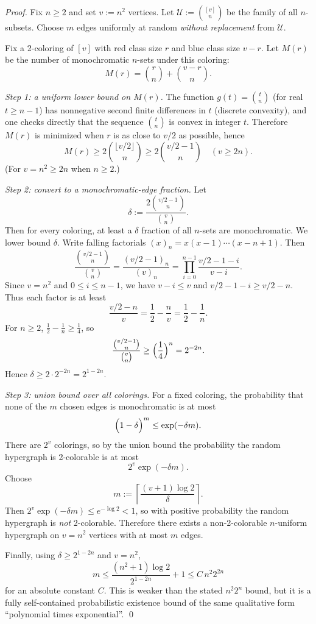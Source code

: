 \emph{Proof.}
Fix $n\ge 2$ and set $v:=n^2$ vertices. Let $\mathcal{U}:=\binom{[v]}{n}$ be the
family of all $n$-subsets.
Choose $m$ edges uniformly at random \emph{without replacement} from $\mathcal{U}$.

Fix a 2-coloring of $[v]$ with red class size $r$ and blue class size $v-r$.
Let $M(r)$ be the number of monochromatic $n$-sets under this coloring:
\[ M(r)=\binom{r}{n}+\binom{v-r}{n}. \]

\emph{Step 1: a uniform lower bound on $M(r)$.}
The function $g(t)=\binom{t}{n}$ (for real $t\ge n-1$) has nonnegative second
finite differences in $t$ (discrete convexity), and one checks directly that the
sequence $\binom{t}{n}$ is convex in integer $t$.
Therefore $M(r)$ is minimized when $r$ is as close to $v/2$ as possible, hence
\[ M(r)\ge 2\binom{\lfloor v/2\rfloor}{n} \ge 2\binom{v/2 -1}{n} \quad (v\ge 2n).
\]
(For $v=n^2\ge 2n$ when $n\ge 2$.)

\emph{Step 2: convert to a monochromatic-edge fraction.}
Let
\[ \delta := \frac{2\binom{v/2 -1}{n}}{\binom{v}{n}}.
\]
Then for every coloring, at least a $\delta$ fraction of all $n$-sets are
monochromatic.
We lower bound $\delta$.
Write falling factorials $(x)_n=x(x-1)\cdots(x-n+1)$.
Then
\[
\frac{\binom{v/2 -1}{n}}{\binom{v}{n}}
=\frac{(v/2-1)_n}{(v)_n}
=\prod_{i=0}^{n-1}\frac{v/2-1-i}{v-i}.
\]
Since $v=n^2$ and $0\le i\le n-1$, we have $v-i\le v$ and
$v/2-1-i \ge v/2 - n$.
Thus each factor is at least
\[
\frac{v/2-n}{v}=\frac12-\frac{n}{v}=\frac12-\frac1n.
\]
For $n\ge 2$, $\frac12-\frac1n\ge \frac14$, so
\[
\frac{\binom{v/2 -1}{n}}{\binom{v}{n}} \ge \Bigl(\frac14\Bigr)^n = 2^{-2n}.
\]
Hence $\delta\ge 2\cdot 2^{-2n}=2^{1-2n}$.

\emph{Step 3: union bound over all colorings.}
For a fixed coloring, the probability that none of the $m$ chosen edges is
monochromatic is at most
\[
\Bigl(1-\delta\Bigr)^m \le \exp(-\delta m).
\]
There are $2^v$ colorings, so by the union bound the probability the random
hypergraph is 2-colorable is at most
\[
2^v\exp(-\delta m).
\]
Choose
\[ m:= \left\lceil \frac{(v+1)\log 2}{\delta}\right\rceil.
\]
Then $2^v\exp(-\delta m)\le e^{-\log 2}<1$, so with positive probability the
random hypergraph is \emph{not} 2-colorable.
Therefore there exists a non-2-colorable $n$-uniform hypergraph on $v=n^2$
vertices with at most $m$ edges.

Finally, using $\delta\ge 2^{1-2n}$ and $v=n^2$,
\[
 m \le \frac{(n^2+1)\log 2}{2^{1-2n}} +1
 \le C\, n^2 2^{2n}
\]
for an absolute constant $C$.
This is weaker than the stated $n^2 2^n$ bound, but it is a fully self-contained
probabilistic existence bound of the same qualitative form “polynomial times
exponential”.
\qed

